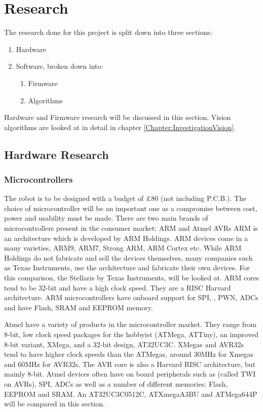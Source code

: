 \chapter{Research} \label{Chapter:Research}
The research done for this project is split down into three sections:
\begin{enumerate}
\item Hardware
\item Software, broken down into:
\begin{enumerate}
\item Firmware
\item Algorithms
\end{enumerate}
\end{enumerate}

Hardware and Firmware research will be discussed in this section. Vision algorithms are looked at in detail in chapter \ref{Chapter:InvestigationVision}.
\section{Hardware Research}
\subsection{Microcontrollers}
The robot is to be designed with a budget of £80 (not including P.C.B.). The choice of microcontroller will be an important one as a compromise between cost, power and usability must be made. There are two main brands of microcontrollers present in the consumer market: ARM and Atmel AVRs %
ARM is an architecture which is developed by ARM Holdings. ARM devices come in a many varieties, ARM9, ARM7, Strong ARM, ARM Cortex etc. While ARM Holdings do not fabricate and sell the devices themselves, many companies such as Texas Instruments, use the architecture and fabricate their own devices. For this comparison, the Stellaris by Texas Instruments, will be looked at. ARM cores tend to be 32-bit and have a high clock speed. They are a RISC Harvard architecture. ARM microcontrollers have onboard support for SPI, \itc, PWN, ADCs and have Flash, SRAM and EEPROM memory. 

Atmel have a variety of products in the microcontroller market. They range from 8-bit, low clock speed packages for the hobbyist (ATMega, ATTiny), an improved 8-bit variant, XMega, and a 32-bit design, AT32UC3C. XMegas and AVR32s tend to have higher clock speeds than the ATMegas, around 30MHz for Xmegas and 60MHz for AVR32s. The AVR core is also a Harvard RISC architecture, but mainly 8-bit. Atmel devices often have on board peripherals such as \itc (called TWI on AVRs), SPI, ADCs as well as a number of different memories: Flash, EEPROM and SRAM. An AT32UC3C0512C, ATXmegaA3BU and ATMega644P will be compared in this section. 


